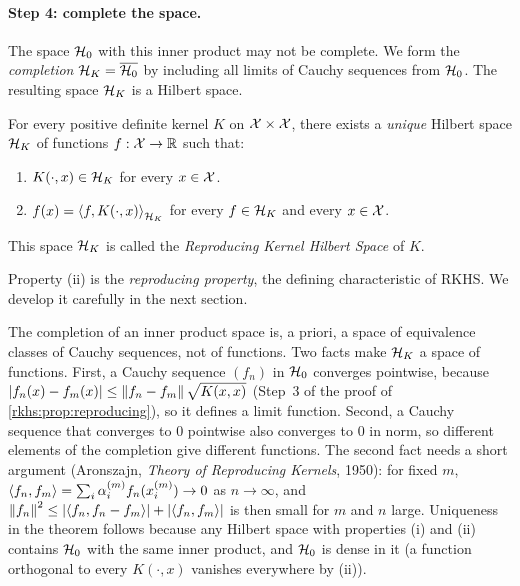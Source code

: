 \begin{notechapter}
\paragraph{Step 4: complete the space.} The space $\mathcal{H}_0$ with this inner
product may not be complete. We form the \emph{completion} $\mathcal{H}_K =
\overline{\mathcal{H}_0}$ by including all limits of Cauchy sequences from
$\mathcal{H}_0$. The resulting space $\mathcal{H}_K$ is a Hilbert space.

\begin{theorem}
\label{rkhs:thm:moore_aronszajn}
For every positive definite kernel $K$ on $\mathcal{X} \times \mathcal{X}$, there exists a
\emph{unique} Hilbert space $\mathcal{H}_K$ of functions $f: \mathcal{X} \to \mathbb{R}$ such
that:
\begin{enumerate}[label=(\roman*)]
  \item $K(\cdot, x) \in \mathcal{H}_K$ for every $x \in \mathcal{X}$.
  \item $f(x) = \left\langle f, K(\cdot, x) \right\rangle_{\mathcal{H}_K}$ for every $f \in \mathcal{H}_K$ and
  every $x \in \mathcal{X}$.
\end{enumerate}
This space $\mathcal{H}_K$ is called the \emph{Reproducing Kernel Hilbert Space} of $K$.
\end{theorem}

Property (ii) is the \emph{reproducing property}, the defining
characteristic of RKHS. We develop it carefully in the next section.

\begin{remark}
The completion of an inner product space is, a priori, a space of equivalence classes of Cauchy sequences, not of functions. Two facts make $\mathcal{H}_K$ a space of functions. First, a Cauchy sequence $(f_n)$ in $\mathcal{H}_0$ converges pointwise, because $\left|f_n(x) - f_m(x)\right| \le \left\|f_n - f_m\right\|\sqrt{K(x,x)}$ (Step~3 of the proof of \cref{rkhs:prop:reproducing}), so it defines a limit function. Second, a Cauchy sequence that converges to $0$ pointwise also converges to $0$ in norm, so different elements of the completion give different functions. The second fact needs a short argument (Aronszajn, \emph{Theory of Reproducing Kernels}, 1950): for fixed $m$, $\left\langle f_n, f_m \right\rangle = \sum_i\alpha_i^{(m)}f_n(x_i^{(m)}) \to 0$ as $n \to \infty$, and $\left\|f_n\right\|^2 \le \left|\left\langle f_n, f_n - f_m \right\rangle\right| + \left|\left\langle f_n, f_m \right\rangle\right|$ is then small for $m$ and $n$ large. Uniqueness in the theorem follows because any Hilbert space with properties (i) and (ii) contains $\mathcal{H}_0$ with the same inner product, and $\mathcal{H}_0$ is dense in it (a function orthogonal to every $K(\cdot, x)$ vanishes everywhere by (ii)).
\end{remark}



\end{notechapter}
